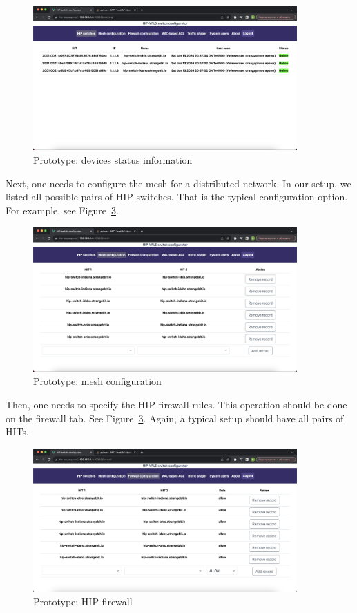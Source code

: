 \begin{figure}[ht!]
\centering
\includegraphics[width=0.9\textwidth]{graphics/devices.png}
\caption{Prototype: devices status information}
\label{fig:devices}
\end{figure}
\clearpage

Next, one needs to configure the mesh for a distributed network. 
In our setup, we listed all possible pairs of HIP-switches. That 
is the typical configuration option. For example, see Figure~\ref{fig:mesh}.

\begin{figure}[h!]
\centering
\includegraphics[width=0.9\textwidth]{graphics/mesh.png}
\caption{Prototype: mesh configuration}
\label{fig:mesh}
\end{figure}
\clearpage

Then, one needs to specify the HIP firewall rules. This operation 
should be done on the firewall tab. See Figure~\ref{fig:mesh}. 
Again, a typical setup should have all pairs of HITs.

\begin{figure}[h!]
\centering
\includegraphics[width=0.9\textwidth]{graphics/HIP-firewall.png}
\caption{Prototype: HIP firewall}
\label{fig:mesh}
\end{figure}
\clearpage

